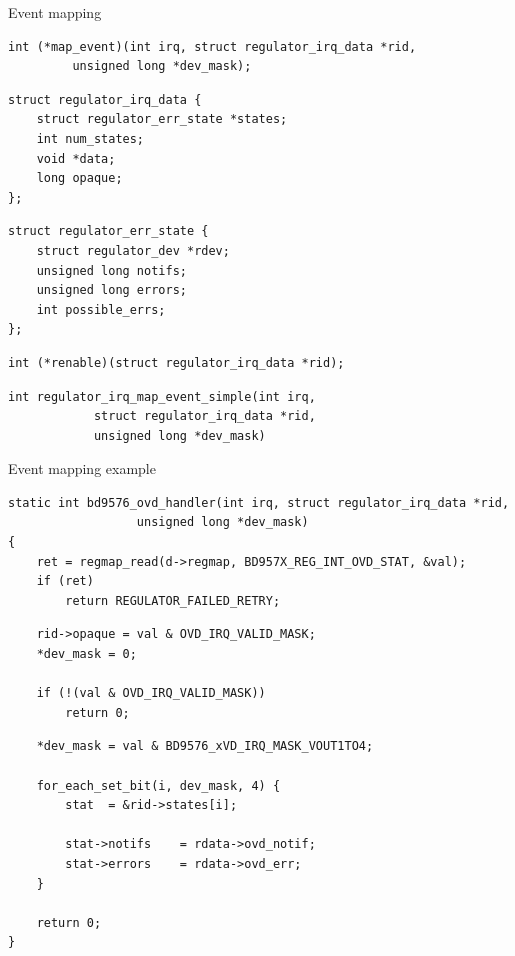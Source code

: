 \documentclass[10pt]{beamer}
\begin{document}

\begin{frame}[fragile]{Event mapping}
\lstset{language=C}
\scriptsize

\begin{lstlisting}
int (*map_event)(int irq, struct regulator_irq_data *rid,
		 unsigned long *dev_mask);
 \end{lstlisting}
\pause
\begin{lstlisting}
struct regulator_irq_data {
	struct regulator_err_state *states;
	int num_states;
	void *data;
	long opaque;
};
 \end{lstlisting}
\pause
\begin{lstlisting}
struct regulator_err_state {
	struct regulator_dev *rdev;
	unsigned long notifs;
	unsigned long errors;
	int possible_errs;
};
 \end{lstlisting}
\pause

\begin{lstlisting}
int (*renable)(struct regulator_irq_data *rid);
 \end{lstlisting}
\pause

\begin{lstlisting}
int regulator_irq_map_event_simple(int irq,
			struct regulator_irq_data *rid,
			unsigned long *dev_mask)
 \end{lstlisting}
\end{frame}


\begin{frame}[fragile]{Event mapping example}
\lstset{language=C}
\scriptsize

\begin{lstlisting}
static int bd9576_ovd_handler(int irq, struct regulator_irq_data *rid,
			      unsigned long *dev_mask)
{
	ret = regmap_read(d->regmap, BD957X_REG_INT_OVD_STAT, &val);
	if (ret)
		return REGULATOR_FAILED_RETRY;

\end{lstlisting}

\pause
\begin{lstlisting}
	rid->opaque = val & OVD_IRQ_VALID_MASK;
	*dev_mask = 0;

	if (!(val & OVD_IRQ_VALID_MASK))
		return 0;
\end{lstlisting}
\pause
\begin{lstlisting}
	*dev_mask = val & BD9576_xVD_IRQ_MASK_VOUT1TO4;

	for_each_set_bit(i, dev_mask, 4) {
		stat  = &rid->states[i];

		stat->notifs	= rdata->ovd_notif;
		stat->errors	= rdata->ovd_err;
	}

	return 0;
}

\end{lstlisting}
\end{frame}
\end{document}
